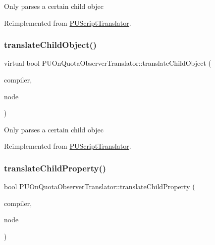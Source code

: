 Only parses a certain child objec 

Reimplemented from \hyperlink{classPUScriptTranslator_ab587d01348ae3e678cb700c719b2b113}{P\+U\+Script\+Translator}.

\mbox{\label{classPUOnQuotaObserverTranslator_a1698378c441ca54c9301c69aaf4c26b5}} 
\subsubsection{\texorpdfstring{translate\+Child\+Object()}{translateChildObject()}\hspace{0.1cm}{\footnotesize\ttfamily [2/2]}}
{\footnotesize\ttfamily virtual bool P\+U\+On\+Quota\+Observer\+Translator\+::translate\+Child\+Object (\begin{DoxyParamCaption}\item[{\hyperlink{classPUScriptCompiler}{P\+U\+Script\+Compiler} $\ast$}]{compiler,  }\item[{\hyperlink{classPUAbstractNode}{P\+U\+Abstract\+Node} $\ast$}]{node }\end{DoxyParamCaption})\hspace{0.3cm}{\ttfamily [virtual]}}

Only parses a certain child objec 

Reimplemented from \hyperlink{classPUScriptTranslator_ab587d01348ae3e678cb700c719b2b113}{P\+U\+Script\+Translator}.

\mbox{\label{classPUOnQuotaObserverTranslator_a8b6332f1af3cfe7be0ac00bb12003f3b}} 
\subsubsection{\texorpdfstring{translate\+Child\+Property()}{translateChildProperty()}\hspace{0.1cm}{\footnotesize\ttfamily [1/2]}}
{\footnotesize\ttfamily bool P\+U\+On\+Quota\+Observer\+Translator\+::translate\+Child\+Property (\begin{DoxyParamCaption}\item[{\hyperlink{classPUScriptCompiler}{P\+U\+Script\+Compiler} $\ast$}]{compiler,  }\item[{\hyperlink{classPUAbstractNode}{P\+U\+Abstract\+Node} $\ast$}]{node }\end{DoxyParamCaption})\hspace{0.3cm}{\ttfamily [virtual]}}

